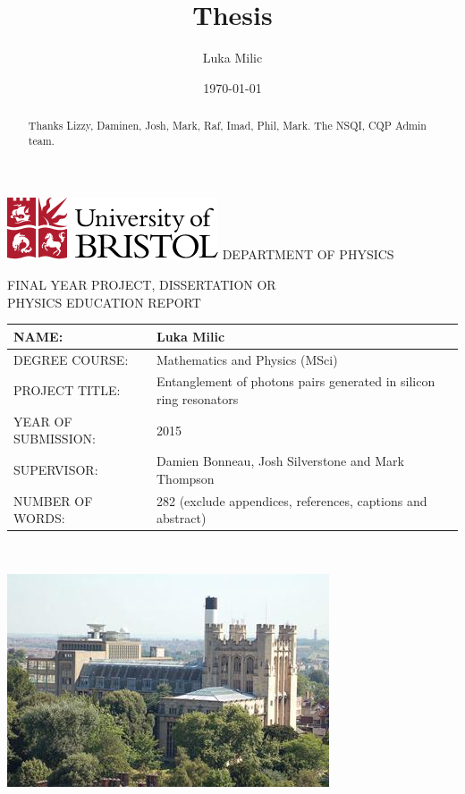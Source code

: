 \documentclass[11pt]{article}
\title{Thesis}
\date{\today}
\author{Luka Milic}
\begin{document}
\begin{titlepage}
\sffamily
  \includegraphics[scale=0.7]{img/uob-logo.png}\hfill
  \LARGE DEPARTMENT OF PHYSICS \\
  \begin{center}
    FINAL YEAR PROJECT, DISSERTATION OR\\
    PHYSICS EDUCATION REPORT
  \end{center} 

  \large
  \begin{tabular}[t]{|l|p{9cm}|}
    \hline
    NAME: & Luka Milic \\ \hline
    DEGREE COURSE: & Mathematics and Physics (MSci)\\ \hline
    PROJECT TITLE: & Entanglement of photons pairs generated in silicon ring resonators \\ \hline
    YEAR OF SUBMISSION: & 2015\\ \hline
    SUPERVISOR: & Damien Bonneau, Josh Silverstone and Mark Thompson\\ \hline
    NUMBER OF WORDS: & 282 (exclude appendices, references, captions and abstract)\\ \hline
  \end{tabular}
  \\[1.5cm]
  \begin{center}
    \includegraphics[scale=1]{img/physics-building.jpg}
  \end{center}
\end{titlepage}
\renewcommand{\abstractname}{Acknowledgements}
\newpage
\begin{abstract}
 Thanks Lizzy, Daminen, Josh, Mark, Raf, Imad, Phil, Mark. The NSQI, CQP Admin team.
\end{abstract}
\newpage
\tableofcontents
\newpage


\end{document}
